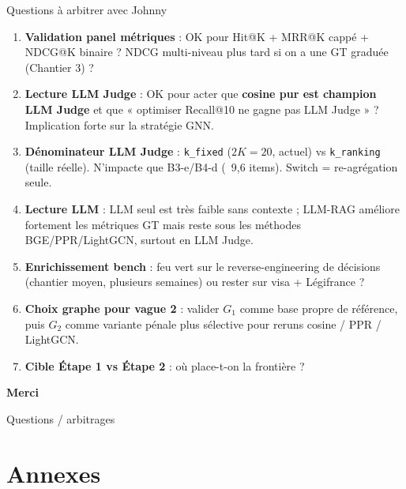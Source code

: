 \documentclass[aspectratio=169,10pt]{beamer}
\begin{document}
\begin{frame}{Questions à arbitrer avec Johnny}
  \footnotesize
  \begin{enumerate}\setlength{\itemsep}{0.3em}
    \item \textbf{Validation panel métriques} : OK pour Hit@K + MRR@K cappé + NDCG@K binaire ?
    NDCG multi-niveau plus tard si on a une GT graduée (Chantier 3) ?
    \item \textbf{Lecture LLM Judge} : OK pour acter que \textbf{cosine pur est champion LLM Judge} et que
    « optimiser Recall@10 ne gagne pas LLM Judge » ? Implication forte sur la stratégie GNN.
    \item \textbf{Dénominateur LLM Judge} : \texttt{k\_fixed} ($2K{=}20$, actuel) vs \texttt{k\_ranking}
    (taille réelle). N'impacte que B3-e/B4-d (~9,6 items). Switch = re-agrégation seule.
    \item \textbf{Lecture LLM} : LLM seul est très faible sans contexte ; LLM-RAG améliore fortement
    les métriques GT mais reste sous les méthodes BGE/PPR/LightGCN, surtout en LLM Judge.
    \item \textbf{Enrichissement bench} : feu vert sur le reverse-engineering de décisions
    (chantier moyen, plusieurs semaines) ou rester sur visa + Légifrance ?
    \item \textbf{Choix graphe pour vague 2} : valider $G_1$ comme base propre de référence,
    puis $G_2$ comme variante pénale plus sélective pour reruns cosine / PPR / LightGCN.
    \item \textbf{Cible Étape 1 vs Étape 2} : où place-t-on la frontière ?
  \end{enumerate}
\end{frame}

\begin{frame}
  \begin{center}
  \vspace{2em}
  \Huge\textcolor{accent}{\textbf{Merci}}

  \vspace{2em}
  \large Questions / arbitrages
  \end{center}
\end{frame}

\appendix
\section{Annexes}
\end{document}
